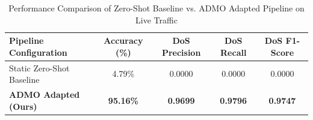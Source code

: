 \begin{table}[htbp]
\centering
\caption{Performance Comparison of Zero-Shot Baseline vs. ADMO Adapted Pipeline on Live Traffic}
\label{tab:admo_performance_comparison}
\begin{tabular}{lcccc}
\hline
\textbf{Pipeline Configuration} & \textbf{Accuracy (\%)} & \textbf{DoS Precision} & \textbf{DoS Recall} & \textbf{DoS F1-Score} \\ \hline
Static Zero-Shot Baseline & 4.79\% & 0.0000 & 0.0000 & 0.0000 \\
\textbf{ADMO Adapted (Ours)} & \textbf{95.16\%} & \textbf{0.9699} & \textbf{0.9796} & \textbf{0.9747} \\ \hline
\end{tabular}
\end{table}
